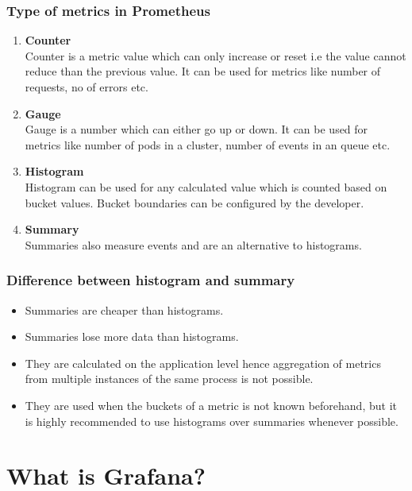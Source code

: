 \documentclass[compress]{beamer}
\begin{document}
\begin{frame}
\frametitle{Type of metrics in Prometheus}
\begin{enumerate}
\item \textbf{Counter} \\
Counter is a metric value which can only increase or reset i.e the value cannot reduce than the previous value. It can be used for metrics like number of requests, no of errors etc.
\item \textbf{Gauge} \\
Gauge is a number which can either go up or down. It can be used for metrics like number of pods in a cluster, number of events in an queue etc. 
\item \textbf{Histogram} \\
Histogram can be used for any calculated value which is counted based on bucket values. Bucket boundaries can be configured by the developer.
\item \textbf{Summary} \\
Summaries also measure events and are an alternative to histograms.
\end{enumerate}
\end{frame}


\begin{frame}
\frametitle{Difference between histogram and summary}
\begin{itemize}
\item Summaries are cheaper than histograms.
\item Summaries lose more data than histograms.
\item They are calculated on the application level hence aggregation of metrics from multiple instances of the same process is not possible.
\item They are used when the buckets of a metric is not known beforehand, but it is highly recommended to use histograms over summaries whenever possible.
\end{itemize}
\end{frame}


\section{What is Grafana?}
\end{document}
